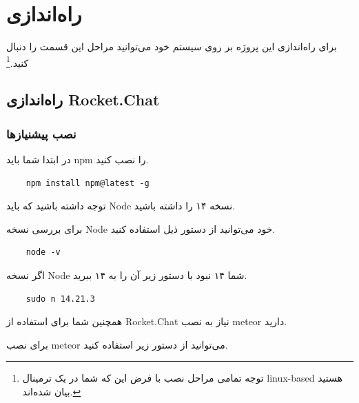 \section{راه‌اندازی}

برای راه‌اندازی این پروژه بر روی سیستم خود می‌توانید مراحل این قسمت را دنبال کنید.\footnote{توجه تمامی مراحل نصب با فرض این که شما در یک ترمینال linux-based هستید بیان شده‌اند.}

\subsection{راه‌اندازی Rocket.Chat}

\subsubsection{نصب پیشنیاز‌ها}

در ابتدا شما باید npm را نصب کنید.

\begin{latin}
    \begin{verbatim}
    npm install npm@latest -g
    \end{verbatim}
\end{latin}


توجه داشته باشید که باید Node نسخه ۱۴ را داشته باشید.

برای بررسی نسخه Node خود می‌توانید از دستور ذیل استفاده کنید.

\begin{latin}
    \begin{verbatim}
    node -v
    \end{verbatim}
\end{latin}


اگر نسخه Node شما ۱۴ نبود با دستور زیر آن را به ۱۴ ببرید.

\begin{latin}
    \begin{verbatim}
    sudo n 14.21.3
    \end{verbatim}
\end{latin}


همچنین شما برای استفاده از Rocket.Chat نیاز به نصب meteor دارید.

برای نصب meteor می‌توانید از دستور زیر استفاده کنید.

